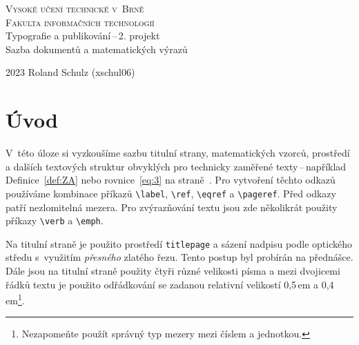 \documentclass[twocolumn,a4paper,11pt]{article}
\begin{document}
\begin{titlepage}
    \begin{center}
        {\Huge \textsc{Vysoké učení technické v~Brně} \\[0.5em]} {\huge \textsc{Fakulta informačních technologií}} \\
        {\LARGE Typografie a publikování\,--\,2. projekt \\[0.4em] Sazba dokumentů a matematických výrazů }\\
    \end{center}

    {\Large 2023 \hfill Roland Schulz (xschul06)}
    \thispagestyle{empty}
\end{titlepage}

\clearpage
{}

\section*{Úvod}
\label{sec:intro}
V~této úloze si vyzkoušíme sazbu titulní strany, matematických vzorců, prostředí a dalších textových struktur obvyklých pro technicky zaměřené texty\,--\,například Definice~\ref{def:ZA} nebo rovnice~\eqref{eq:3} na straně~\pageref{sec:rovnice}. Pro vytvoření těchto odkazů používáme kombinace příkazů \verb|\label|, \verb|\ref|, \verb|\eqref| a \verb|\pageref|. Před odkazy patří nezlomitelná mezera. Pro zvýrazňování textu jsou zde několikrát použity příkazy \verb|\verb| a \verb|\emph|.

Na titulní straně je použito prostředí \verb|titlepage| a sázení nadpisu podle optického středu s~využitím \emph{přesného} zlatého řezu. Tento postup byl probírán na přednášce. Dále jsou na titulní straně použity čtyři různé velikosti písma a mezi dvojicemi řádků textu je použito odřádkování se zadanou relativní velikostí 0,5\,em a 0,4\,em\footnote{Nezapomeňte použít správný typ mezery mezi číslem a jednotkou.}.
\end{document}

